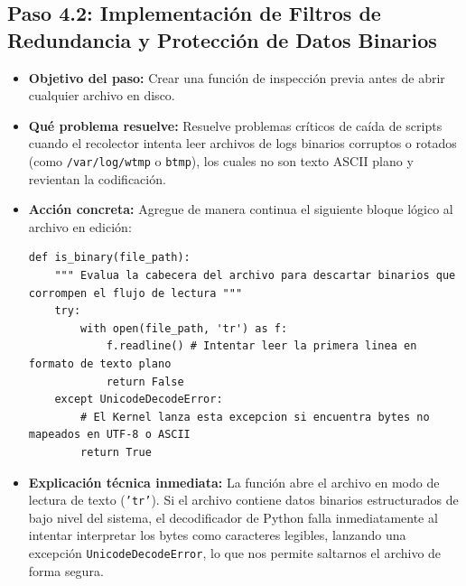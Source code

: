 \documentclass[
  coursetitle={Cómputo Nube y Tecnologías Emergentes},
  coursehours={96},
  coursedate={Verano 2026},
  doctype={Práctica},
  otherlangs={english,french},
  authorname={Lázaro},
  authorsurname={Bustio-Martínez},
  authortitle={PhD},
  role={Profesor Investigador},
  email={lbustio@inaoe.mx},
  phone={5559504000},
  ext={7459},
  institution={Instituto Nacional de Astrofísica, Óptica y Electrónica (INAOE)},
  department={Maestría en Ciencias en Tecnologías de Seguridad},
  address={Luis Enrique Erro 1, Sta. Ma. Tonantzintla, San Andrés Cholula, CP 72840, Puebla, México},
  margin={0.5in}
]{../../lbustio_lecture_notes}
\begin{document}
\subsection{Paso 4.2: Implementación de Filtros de Redundancia y Protección de Datos Binarios}
\begin{itemize}
    \item \textbf{Objetivo del paso:} Crear una función de inspección previa antes de abrir cualquier archivo en disco.
    \item \textbf{Qué problema resuelve:} Resuelve problemas críticos de caída de scripts cuando el recolector intenta leer archivos de logs binarios corruptos o rotados (como \texttt{/var/log/wtmp} o \texttt{btmp}), los cuales no son texto ASCII plano y revientan la codificación.
    \item \textbf{Acción concreta:} Agregue de manera continua el siguiente bloque lógico al archivo en edición:
\begin{verbatim}
def is_binary(file_path):
    """ Evalua la cabecera del archivo para descartar binarios que corrompen el flujo de lectura """
    try:
        with open(file_path, 'tr') as f:
            f.readline() # Intentar leer la primera linea en formato de texto plano
            return False
    except UnicodeDecodeError:
        # El Kernel lanza esta excepcion si encuentra bytes no mapeados en UTF-8 o ASCII
        return True
\end{verbatim}
    \item \textbf{Explicación técnica inmediata:} La función abre el archivo en modo de lectura de texto (\texttt{'tr'}). Si el archivo contiene datos binarios estructurados de bajo nivel del sistema, el decodificador de Python falla inmediatamente al intentar interpretar los bytes como caracteres legibles, lanzando una excepción \texttt{UnicodeDecodeError}, lo que nos permite saltarnos el archivo de forma segura.
\end{itemize}
\end{document}
